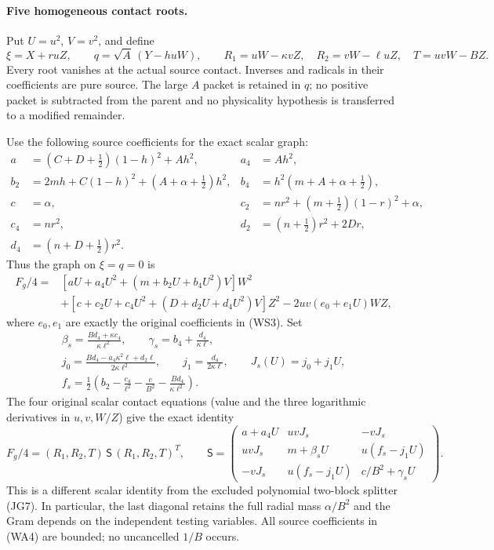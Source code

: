 \paragraph{Five homogeneous contact roots.}
Put $U=u^2$, $V=v^2$, and define
\[
 \xi=X+ruZ,\qquad q=\sqrt A\,(Y-huW),\qquad
 R_1=uW-\kappa vZ,\quad R_2=vW-\ell uZ,\quad
 T=uvW-BZ.                                             \tag{WA3}
\]
Every root vanishes at the actual source contact. Inverses and
radicals in their coefficients are pure source. The large $A$
packet is retained in $q$; no positive packet is subtracted from
the parent and no physicality hypothesis is transferred to a
modified remainder.

Use the following source coefficients for the exact scalar graph:
\begin{align*}
 a&=(C+D+\tfrac12)(1-h)^2+Ah^2,&a_4&=Ah^2,\\
 b_2&=2mh+C(1-h)^2+(A+\alpha+\tfrac12)h^2,
 &b_4&=h^2(m+A+\alpha+\tfrac12),\\
 c&=\alpha,&c_2&=nr^2+(m+\tfrac12)(1-r)^2+\alpha,\\
 c_4&=nr^2,&d_2&=(n+\tfrac12)r^2+2Dr,\\
 d_4&=(n+D+\tfrac12)r^2.
\end{align*}
Thus the graph on $\xi=q=0$ is
\[
 \begin{split}
 F_g/4={}&[aU+a_4U^2+(m+b_2U+b_4U^2)V]W^2\\
 &+[c+c_2U+c_4U^2+(D+d_2U+d_4U^2)V]Z^2
       -2uv(e_0+e_1U)WZ,
 \end{split}
\]
where $e_0,e_1$ are exactly the original coefficients in (WS3).
Set
\[
 \begin{gathered}
 \beta_s=\frac{Bd_4+\kappa c_4}{\kappa\ell^2},\qquad
 \gamma_s=b_4+\frac{d_4}{\kappa\ell},\\
 j_0=\frac{Bd_4-a_4\kappa^2\ell+d_2\ell}
                   {2\kappa\ell^2},\qquad
 j_1=\frac{d_4}{2\kappa\ell},\qquad J_s(U)=j_0+j_1U,\\
 f_s=\frac12\left(b_2-\frac{c_4}{\ell^2}
                -\frac c{B^2}-\frac{Bd_4}{\kappa\ell^2}\right).
 \end{gathered}                                        \tag{WA4}
\]
The four original scalar contact equations (value and the three
logarithmic derivatives in $u,v,W/Z$) give the exact identity
\[
 F_g/4=(R_1,R_2,T)\,\mathsf S\,(R_1,R_2,T)^T,\qquad
 \mathsf S=
 \begin{pmatrix}
 a+a_4U&uvJ_s&-vJ_s\\
 uvJ_s&m+\beta_sU&u(f_s-j_1U)\\
 -vJ_s&u(f_s-j_1U)&c/B^2+\gamma_sU
 \end{pmatrix}.                                       \tag{WA5}
\]
This is a different scalar identity from the excluded polynomial
two-block splitter (JG7). In particular, the last diagonal retains
the full radial mass $\alpha/B^2$ and the Gram depends on the
independent testing variables. All source coefficients in (WA4)
are bounded; no uncancelled $1/B$ occurs.

